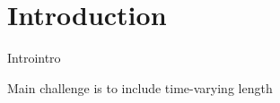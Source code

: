 \section{Introduction}\label{sec:introduction}
Introintro

Main challenge is to include time-varying length 
